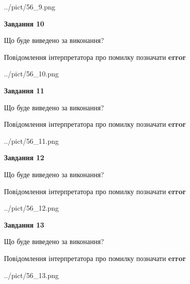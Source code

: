 \documentclass[11pt, ukrainian]{article}
\begin{document}
{\begin {large}
\begin{center}
	{../pict/56_9.png}
\end{center}
\newpage

{\begin {center}\textbf{Завдання 10}\end {center}}\par
Що буде виведено за виконання? \par
Повідомлення інтерпретатора про помилку позначати \textbf{error}

\begin{center}
	{../pict/56_10.png}
\end{center}
\newpage

{\begin {center}\textbf{Завдання 11}\end {center}}\par
Що буде виведено за виконання? \par
Повідомлення інтерпретатора про помилку позначати \textbf{error}

\begin{center}
	{../pict/56_11.png}
\end{center}
\newpage

{\begin {center}\textbf{Завдання 12}\end {center}}\par
Що буде виведено за виконання? \par
Повідомлення інтерпретатора про помилку позначати \textbf{error}

\begin{center}
	{../pict/56_12.png}
\end{center}
\newpage

{\begin {center}\textbf{Завдання 13}\end {center}}\par
Що буде виведено за виконання? \par
Повідомлення інтерпретатора про помилку позначати \textbf{error}

\begin{center}
	{../pict/56_13.png}
\end{center}
\newpage


\end{large}}
\end{document}
